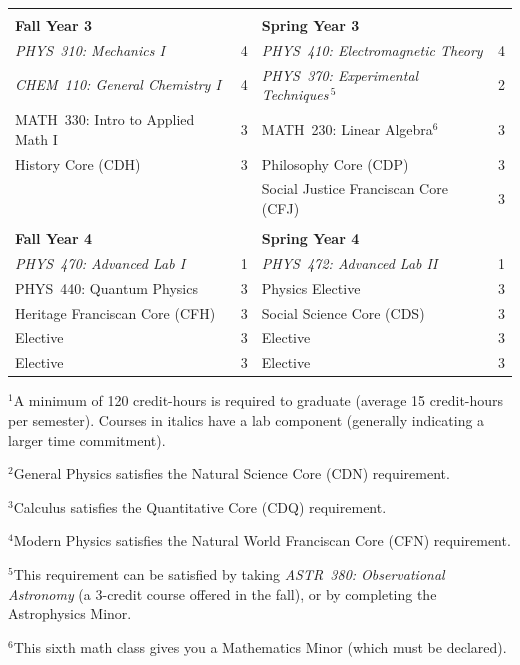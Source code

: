 \documentclass[12pt]{article}
\begin{document}
\begin{table}[h!]
\begin{center}
{\begin{tabular*}{0.9\textwidth}{@{\extracolsep{\fill}}lclc}
 & \\
{\Large \textbf{Fall Year 3}} & & {\Large \textbf{Spring Year 3}} & \\
\hline
{\em PHYS~310: Mechanics I}         & 4 & {\em PHYS~410: Electromagnetic Theory}  & 4 \\
{\em CHEM~110: General Chemistry I} & 4 & {\em PHYS~370: Experimental Techniques}\,$^{5}$ & 2 \\
MATH~330: Intro to Applied Math I   & 3 & MATH~230: Linear Algebra$^{6}$    & 3 \\
History Core (CDH)                  & 3 & Philosophy Core (CDP)             & 3 \\
                                    &   & Social Justice Franciscan Core (CFJ) & 3 \\
 & \\
{\Large \textbf{Fall Year 4}} & & {\Large \textbf{Spring Year 4}} & \\
\hline
{\em PHYS~470: Advanced Lab I} & 1 & {\em PHYS~472: Advanced Lab II}  & 1 \\
PHYS~440: Quantum Physics      & 3 & Physics Elective           & 3 \\
Heritage Franciscan Core (CFH) & 3 & Social Science Core (CDS) & 3 \\
Elective                       & 3 & Elective                  & 3 \\
Elective                       & 3 & Elective                  & 3 \\
\hline
\end{tabular*}
}
\end{center}
\end{table}

\vspace*{-4mm}
\hspace{0.1in}$^{1}$A minimum of 120 credit-hours is required to
graduate (average 15 credit-hours per semester).  \hspace*{0.42in}Courses in italics have a lab
component (generally indicating a larger time commitment). 

\hspace{0.1in}$^{2}$General Physics satisfies the Natural Science Core (CDN) requirement.

\hspace{0.1in}$^{3}$Calculus satisfies the Quantitative Core (CDQ) requirement.

\hspace{0.1in}$^{4}$Modern Physics satisfies the Natural World Franciscan Core
(CFN) requirement.

\hspace{0.1in}$^{5}$This requirement can be satisfied by taking {\em ASTR~380:
  Observational Astronomy} (a 3-credit \hspace*{0.42in}course offered in the
fall), or by completing the Astrophysics Minor.

\hspace{0.1in}$^{6}$This sixth math class gives you a Mathematics Minor (which
must be declared).
\end{document}
